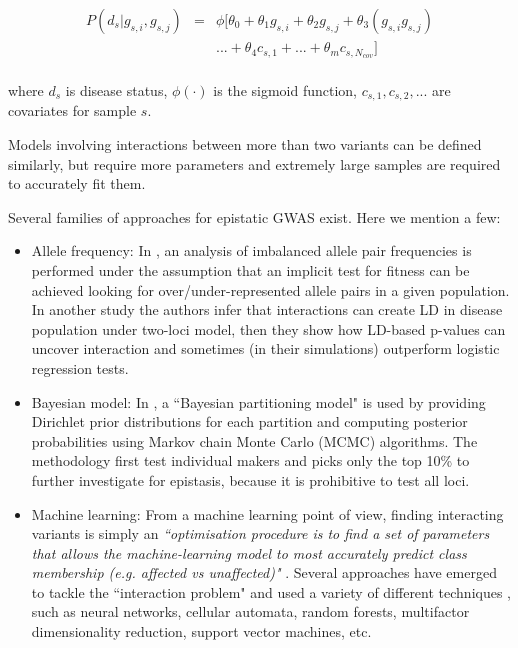 \begin{eqnarray*} \label{eq:gwasLogRegH1}
    P( d_s | g_{s,i},g_{s,j}) & = & \phi[ \theta_0 + \theta_1 g_{s,i} + \theta_2 g_{s,j} + \theta_3 (g_{s,i} g_{s,j}) \\
    & & ... + \theta_4 c_{s,1} + ... + \theta_m c_{s,N_{cov}} ] \\
\end{eqnarray*}

where $d_s$ is disease status, $\phi(\cdot)$ is the sigmoid function, $c_{s,1}, c_{s,2}, ... $ are covariates for sample $s$.

Models involving interactions between more than two variants can be defined similarly, but require more parameters and extremely large samples are required to accurately fit them.

Several families of approaches for epistatic GWAS exist. Here we mention a few:

\begin{itemize}

\item Allele frequency: In \cite{ackermann2012systematic}, an analysis of imbalanced allele pair frequencies is performed under the assumption that an implicit test for fitness can be achieved looking for over/under-represented allele pairs in a given population. In another study \cite{zhao2006test} the authors infer that interactions can create LD in disease population under two-loci model, then they show how LD-based p-values can uncover interaction and sometimes (in their simulations) outperform logistic regression tests.

\item Bayesian model: In \cite{zhang2007bayesian}, a ``Bayesian partitioning model" is used by providing Dirichlet prior distributions for each partition and computing posterior probabilities using Markov chain Monte Carlo (MCMC) algorithms.  The methodology first test individual makers and picks only the top 10\% to further investigate for epistasis, because it is prohibitive to test all loci.

\item Machine learning: From a machine learning point of view, finding interacting variants is simply an \textit{``optimisation procedure is to find a set of parameters that allows the machine-learning model to most accurately predict class membership (e.g. affected vs unaffected)"} \cite{mckinney2006machine}. Several approaches have emerged to tackle the ``interaction problem" and used a variety of different techniques \cite{koo2013review, mckinney2006machine} , such as neural networks, cellular automata, random forests, multifactor dimensionality reduction, support vector machines, etc.

\end{itemize}


